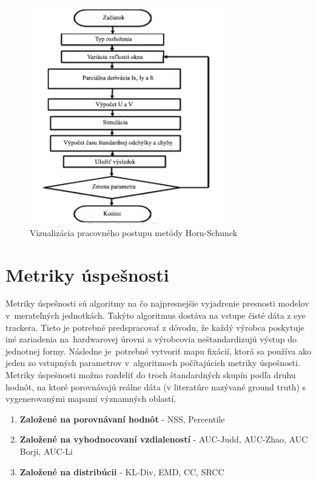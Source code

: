 \begin{figure}[H]
  \centering
  \includegraphics[width=8.5cm]{pics/horn-schunck.png}
  \caption{Vizualizácia pracovného postupu metódy Horn-Schunck\cite{horn-schunck}}
\end{figure}
\vspace{10mm}

\section{Metriky úspešnosti}
Metriky úspešnosti sú algoritmy na čo najpresnejšie vyjadrenie presnosti modelov v~merateľných jednotkách.
Takýto algoritmus dostáva na vstupe čisté dáta z eye trackera.
Tieto je potrebné predspracovať z dôvodu, že každý výrobca poskytuje iné zariadenia na~hardwarovej úrovni a výrobcovia neštandardizujú výstup do jednotnej formy.
Následne je~potrebné vytvoriť mapu fixácií, ktorá sa používa ako jeden zo vstupných parametrov v~algoritmoch počítajúcich metriky úspešnosti.
\\
Metriky úspešnosti možno rozdeliť do troch štandardných skupín podľa druhu hodnôt, na ktoré porovnávajú reálne dáta (v literatúre nazývané ground truth) s vygenerovanými mapami významných oblastí\cite{metrics-1}.
\begin{enumerate}
  \item\textbf{Založené na porovnávaní hodnôt} - NSS, Percentile
  \item\textbf{Založené na vyhodnocovaní vzdialeností} - AUC-Judd, AUC-Zhao, AUC Borji, AUC-Li
  \item\textbf{Založené na distribúcii} - KL-Div, EMD, CC, SRCC
\end{enumerate}

